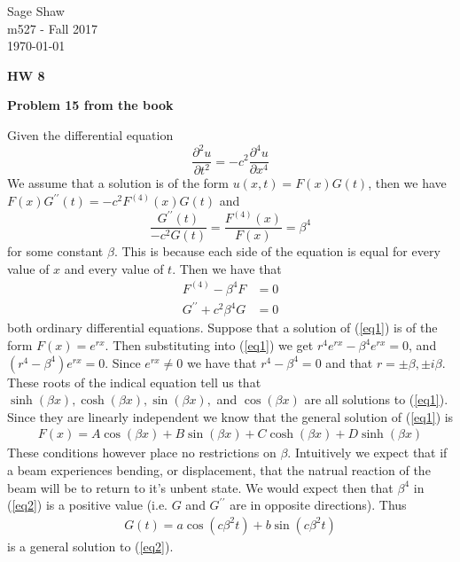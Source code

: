 \documentclass[12pt]{article}
\newcommand{\problem}[1]{\hspace{-4 ex} \large \textbf{Problem #1} }
\begin{document}
	\thispagestyle{empty}
	
	\begin{flushright}
		Sage Shaw \\
		m527 - Fall 2017 \\
		\today
	\end{flushright}
	
{\large \textbf{HW 8}}\bigbreak

\problem{15 from the book}

	Given the differential equation
	$$
	\frac{\partial^2u}{\partial t^2} = -c^2 \frac{\partial^4u}{\partial x^4}
	$$
	We assume that a solution is of the form $u(x,t) = F(x)G(t)$, then we have $F(x)G^{\prime\prime}(t) = -c^2 F^{(4)}(x)G(t)$ and
	$$
	\frac{G^{\prime\prime}(t)}{-c^2 G(t)} = \frac{F^{(4)}(x)}{F(x)} = \beta^4
	$$
	for some constant $\beta$. This is because each side of the equation is equal for every value of $x$ and every value of $t$. Then we have that
	\begin{align}
		F^{(4)}- \beta^4F & = 0 \label{eq1} \\
		G^{\prime\prime}+ c^2\beta^4G & = 0 \label{eq2}
	\end{align}
	both ordinary differential equations. Suppose that a solution of (\ref{eq1}) is of the form $F(x) = e^{rx}$. Then substituting into (\ref{eq1}) we get $r^4e^{rx} - \beta^4e^{rx} = 0$, and $(r^4-\beta^4)e^{rx}=0$. Since $e^{rx} \neq 0$ we have that $r^4-\beta^4=0$ and that $r = \pm \beta, \pm i\beta$. These roots of the indical equation tell us that $\sinh(\beta x), \cosh(\beta x), \sin(\beta x),$ and $\cos(\beta x)$ are all solutions to (\ref{eq1}). Since they are linearly independent we know that the general solution of (\ref{eq1}) is
	\begin{align}
		F(x) = A \cos(\beta x) + B \sin(\beta x) + C \cosh(\beta x) + D \sinh(\beta x) \label{eq3}
	\end{align}
	These conditions however place no restrictions on $\beta$. Intuitively we expect that if a beam experiences bending, or displacement, that the natrual reaction of the beam will be to return to it's unbent state. We would expect then that $\beta^4$ in (\ref{eq2}) is a positive value (i.e. $G$ and $G^{\prime\prime}$ are in opposite directions). Thus
	\begin{align}
		G(t) = a\cos(c\beta^2 t) + b\sin(c\beta^2 t) \label{eq4}
	\end{align}
	is a general solution to (\ref{eq2}).
	
\end{document}
